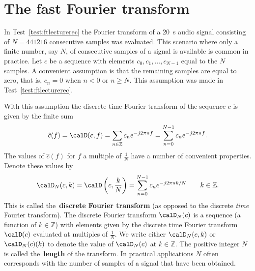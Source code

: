 \documentclass[11pt,a4paper]{book}
\theoremstyle{plain}
\numberwithin{equation}{section}
\newcommand{\ints}{{\mathbb Z}}
\newcommand{\term}{\textbf}
\newcounter{test}
\begin{document}
\section{The fast Fourier transform}\label{sec:fast-four-transf}

In Test~\ref{test:ftlecturerec} the Fourier transform of a \SI{20}{\second} audio signal consisting of $N=441216$ consecutive samples was evaluated.  This scenario where only a finite number, say $N$, of consecutive samples of a signal is available is common in practice.  Let $c$ be a sequence with elements $c_0,c_1,\dots, c_{N-1}$ equal to the $N$ samples.  A convenient assumption is that the remaining samples are equal to zero, that is, $c_n = 0$ when $n < 0$ or $n \geq N$.  This assumption was made in Test~\ref{test:ftlecturerec}.

With this assumption the discrete time Fourier transform of the sequence $c$ is given by the finite sum
\[
\hat{c}(f) = \calD(c, f) = \sum_{n \in \ints} c_n e^{-j 2\pi n f}  = \sum_{n = 0}^{N-1} c_n e^{-j 2\pi n f}.
\]
The values of $\hat{c}(f)$ for $f$ a multiple of $\tfrac{1}{N}$ have a number of convenient properties.  Denote these values by
\begin{equation}\label{eq:dftdefn}
\calD_N(c, k) = \calD\left(c, \frac{k}{N} \right) = \sum_{n = 0}^{N-1} c_n e^{-j 2\pi n k/N} \qquad k \in \ints. 
\end{equation}
This is called the~\term{discrete Fourier transform} (as opposed to the discrete \emph{time} Fourier transform).  The discrete Fourier transform $\calD_N(c)$ is a sequence (a function of $k \in \ints$) with elements given by the discrete time Fourier transform $\calD(c)$ evaluated at multiples of $\tfrac{1}{N}$.  We write either $\calD_N(c,k)$ or $\calD_N(c)(k)$ to denote the value of $\calD_N(c)$ at $k \in \ints$.  The positive integer $N$ is called the~\term{length} of the transform.  In practical applications $N$ often corresponds with the number of samples of a signal that have been obtained.

\end{document}
